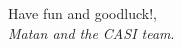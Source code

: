 \documentclass[11pt]{article}
\begin{document}




\begin{center}
Have fun and goodluck!, \\
\emph{Matan and the CASI team}.
\end{center}

\printbibliography
\end{document}
